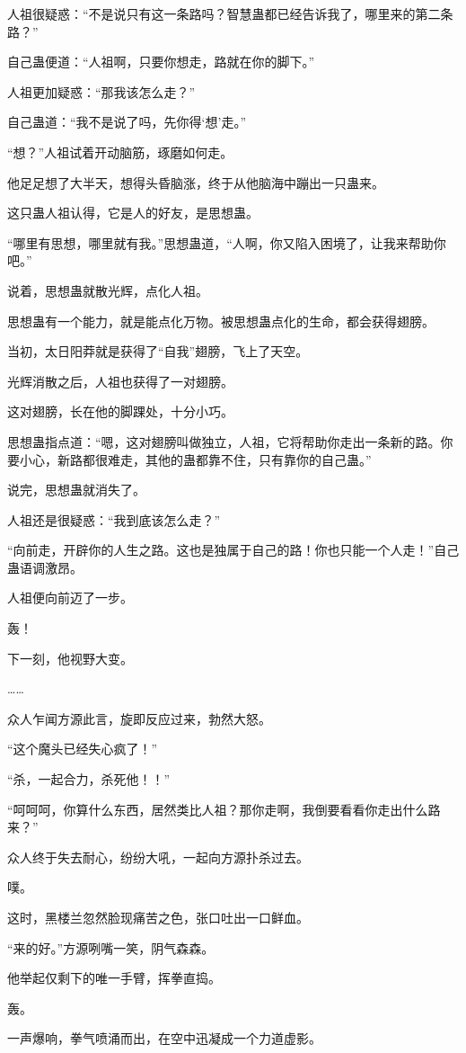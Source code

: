 \begin{this_body}
人祖很疑惑：“不是说只有这一条路吗？智慧蛊都已经告诉我了，哪里来的第二条路？”

自己蛊便道：“人祖啊，只要你想走，路就在你的脚下。”

人祖更加疑惑：“那我该怎么走？”

自己蛊道：“我不是说了吗，先你得‘想’走。”

“想？”人祖试着开动脑筋，琢磨如何走。

他足足想了大半天，想得头昏脑涨，终于从他脑海中蹦出一只蛊来。

这只蛊人祖认得，它是人的好友，是思想蛊。

“哪里有思想，哪里就有我。”思想蛊道，“人啊，你又陷入困境了，让我来帮助你吧。”

说着，思想蛊就散光辉，点化人祖。

思想蛊有一个能力，就是能点化万物。被思想蛊点化的生命，都会获得翅膀。

当初，太日阳莽就是获得了“自我”翅膀，飞上了天空。

光辉消散之后，人祖也获得了一对翅膀。

这对翅膀，长在他的脚踝处，十分小巧。

思想蛊指点道：“嗯，这对翅膀叫做独立，人祖，它将帮助你走出一条新的路。你要小心，新路都很难走，其他的蛊都靠不住，只有靠你的自己蛊。”

说完，思想蛊就消失了。

人祖还是很疑惑：“我到底该怎么走？”

“向前走，开辟你的人生之路。这也是独属于自己的路！你也只能一个人走！”自己蛊语调激昂。

人祖便向前迈了一步。

轰！

下一刻，他视野大变。

……

众人乍闻方源此言，旋即反应过来，勃然大怒。

“这个魔头已经失心疯了！”

“杀，一起合力，杀死他！！”

“呵呵呵，你算什么东西，居然类比人祖？那你走啊，我倒要看看你走出什么路来？”

众人终于失去耐心，纷纷大吼，一起向方源扑杀过去。

噗。

这时，黑楼兰忽然脸现痛苦之色，张口吐出一口鲜血。

“来的好。”方源咧嘴一笑，阴气森森。

他举起仅剩下的唯一手臂，挥拳直捣。

轰。

一声爆响，拳气喷涌而出，在空中迅凝成一个力道虚影。

\end{this_body}

